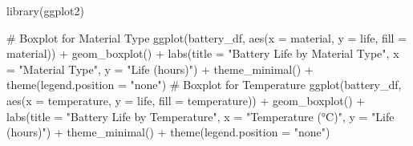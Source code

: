 \documentclass[
  letterpaper,
  DIV=11,
  numbers=noendperiod]{scrreprt}
\newenvironment{Shaded}{\begin{snugshade}}{\end{snugshade}}
\newcommand{\AttributeTok}[1]{\textcolor[rgb]{0.40,0.45,0.13}{#1}}
\newcommand{\CommentTok}[1]{\textcolor[rgb]{0.37,0.37,0.37}{#1}}
\newcommand{\FunctionTok}[1]{\textcolor[rgb]{0.28,0.35,0.67}{#1}}
\newcommand{\NormalTok}[1]{\textcolor[rgb]{0.00,0.23,0.31}{#1}}
\newcommand{\SpecialCharTok}[1]{\textcolor[rgb]{0.37,0.37,0.37}{#1}}
\newcommand{\StringTok}[1]{\textcolor[rgb]{0.13,0.47,0.30}{#1}}
\begin{document}
\begin{Shaded}
\begin{Highlighting}[]
\FunctionTok{library}\NormalTok{(ggplot2)}

\CommentTok{\# Boxplot for Material Type}
\FunctionTok{ggplot}\NormalTok{(battery\_df, }\FunctionTok{aes}\NormalTok{(}\AttributeTok{x =}\NormalTok{ material, }\AttributeTok{y =}\NormalTok{ life, }\AttributeTok{fill =}\NormalTok{ material)) }\SpecialCharTok{+}
  \FunctionTok{geom\_boxplot}\NormalTok{() }\SpecialCharTok{+}
  \FunctionTok{labs}\NormalTok{(}\AttributeTok{title =} \StringTok{"Battery Life by Material Type"}\NormalTok{, }\AttributeTok{x =} \StringTok{"Material Type"}\NormalTok{, }\AttributeTok{y =} \StringTok{"Life (hours)"}\NormalTok{) }\SpecialCharTok{+}
  \FunctionTok{theme\_minimal}\NormalTok{() }\SpecialCharTok{+}
  \FunctionTok{theme}\NormalTok{(}\AttributeTok{legend.position =} \StringTok{"none"}\NormalTok{)}
\CommentTok{\# Boxplot for Temperature}
\FunctionTok{ggplot}\NormalTok{(battery\_df, }\FunctionTok{aes}\NormalTok{(}\AttributeTok{x =}\NormalTok{ temperature, }\AttributeTok{y =}\NormalTok{ life, }\AttributeTok{fill =}\NormalTok{ temperature)) }\SpecialCharTok{+}
  \FunctionTok{geom\_boxplot}\NormalTok{() }\SpecialCharTok{+}
  \FunctionTok{labs}\NormalTok{(}\AttributeTok{title =} \StringTok{"Battery Life by Temperature"}\NormalTok{, }\AttributeTok{x =} \StringTok{"Temperature (°C)"}\NormalTok{, }\AttributeTok{y =} \StringTok{"Life (hours)"}\NormalTok{) }\SpecialCharTok{+}
  \FunctionTok{theme\_minimal}\NormalTok{() }\SpecialCharTok{+}
  \FunctionTok{theme}\NormalTok{(}\AttributeTok{legend.position =} \StringTok{"none"}\NormalTok{)}
\end{Highlighting}
\end{Shaded}
\end{document}
